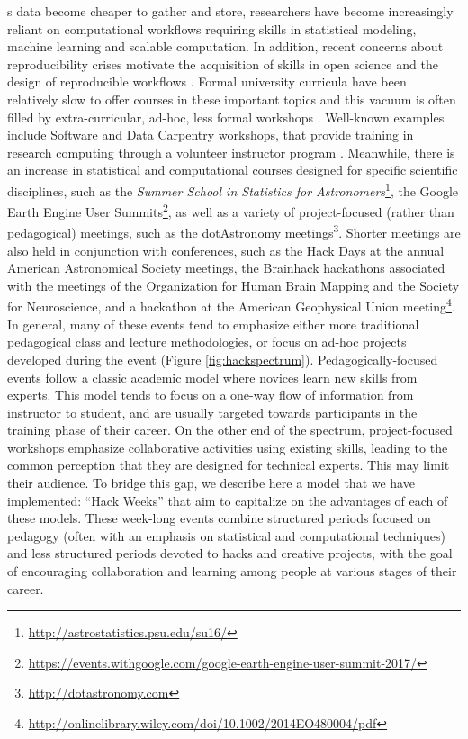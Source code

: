 \label{sec:introduction}
s data become cheaper to gather and store, researchers have become increasingly reliant on computational workflows requiring skills in statistical modeling, machine learning and scalable computation. In addition, recent concerns about reproducibility crises motivate the acquisition of skills in open science and the design of reproducible workflows \cite[e.g.][]{pashler2012,baker2016}.
Formal university curricula have been relatively slow to offer courses in these important topics and this vacuum is often filled by extra-curricular, ad-hoc, less formal workshops \cite{demasi2017}.
Well-known examples include Software and Data Carpentry workshops, that provide training in research computing through a volunteer instructor program \cite{b:wilson-swc-lessons-2016,teal2015data}.
Meanwhile, there is an increase in statistical and computational courses designed for specific scientific disciplines, such as the \textit{Summer School in Statistics for Astronomers}\footnote{\url{http://astrostatistics.psu.edu/su16/}}, the Google Earth Engine User Summits\footnote{\url{https://events.withgoogle.com/google-earth-engine-user-summit-2017/}}, as well as a variety of project-focused (rather than pedagogical) meetings, such as the dotAstronomy meetings\footnote{\url{http://dotastronomy.com}}.
Shorter meetings are also held in conjunction with conferences, such as the Hack Days at the annual American Astronomical Society meetings, the Brainhack hackathons associated with the meetings of the Organization for Human Brain Mapping and the Society for Neuroscience\cite{Cameron_Craddock2016-wc}, and a hackathon at the American Geophysical Union meeting\footnote{\url{http://onlinelibrary.wiley.com/doi/10.1002/2014EO480004/pdf}}.
In general, many of these events tend to emphasize either more traditional pedagogical class and lecture methodologies, or focus on ad-hoc projects developed during the event (Figure \ref{fig:hackspectrum}).
Pedagogically-focused events follow a classic academic model where novices learn new skills from experts. This model tends to focus on a one-way flow of information from instructor to student, and are usually targeted towards participants in the training phase of their career. On the other end of the spectrum, project-focused workshops emphasize collaborative activities using existing skills, leading to the common perception that they are designed for technical experts. This may limit their audience.
To bridge this gap, we describe here a model that we have implemented: ``Hack Weeks'' that aim to capitalize on the advantages of each of these models.
These week-long events combine structured periods focused on pedagogy (often with an emphasis on statistical and computational techniques) and less structured periods devoted to hacks and creative projects, with the goal of encouraging collaboration and learning among people at various stages of their career.
\renewcommand{\floatpagefraction}{.3}%
\renewcommand{\dblfloatpagefraction}{.3}%

